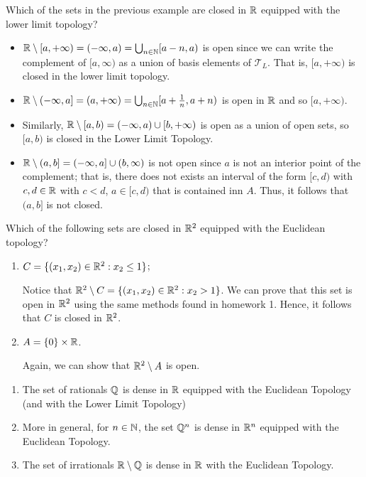 \documentclass[a4paper]{article}
\begin{document}
    \begin{eg}
        Which of the sets in the previous example are closed in \( \mathbb{R}  \) equipped with the lower limit topology?
        \begin{itemize}
            \item \( \mathbb{R} \setminus  [a,+\infty) = (-\infty ,a ) = \bigcup_{ n \in \mathbb{N}  }^{  } [a-n,a)   \) is open since we can write the complement of \( [a,\infty)  \) as a union of basis elements of \( {\mathcal{T}}_{L} \). That is, \( [a,+\infty) \) is closed in the lower limit topology.
            \item \( \mathbb{R} \setminus  (-\infty ,a] = (a,+\infty ) = \bigcup_{ n \in \mathbb{N}  }^{  } [a+ \frac{ 1 }{ n } , a + n) \) is open in \( \mathbb{R}  \) and so \( [a,+\infty) \).
            \item Similarly, \( \mathbb{R} \setminus  [a,b) = (-\infty , a) \cup [b,+\infty) \) is open as a union of open sets, so \( [a,b) \) is closed in the Lower Limit Topology.
            \item \( \mathbb{R} \setminus  (a,b] = (-\infty , a] \cup (b,\infty ) \) is not open since \( a  \) is not an interior point of the complement; that is, there does not exists an interval of the form \( [c,d)  \) with \( c,d \in \mathbb{R}  \) with \( c < d  \), \( a \in [c,d)  \) that is contained inn \( A  \). Thus, it follows that \( (a,b]  \) is not closed.
        \end{itemize}
    \end{eg}

\begin{eg}
    Which of the following sets are closed in \( \mathbb{R}^{2} \) equipped with the Euclidean topology? 
    \begin{enumerate}
        \item[(i)] \( C =  \{ ({x}_{1}, {x}_{2}) \in \mathbb{R}^{2} : {x}_{2} \leq 1  \}  \);

            Notice that \( \mathbb{R}^{2} \setminus  C  = \{ ({x}_{1}, {x}_{2}) \in \mathbb{R}^{2} : {x}_{2} > 1  \}  \). We can prove that this set is open in \( \mathbb{R}^{2} \) using the same methods found in homework 1. Hence, it follows that \( C  \) is closed in \( \mathbb{R}^{2} \).
        \item[(ii)] \( A = \{ 0 \}  \times \mathbb{R}  \).

            Again, we can show that \(  \mathbb{R}^{2} \setminus  A   \) is open.
    \end{enumerate}
\end{eg}

\begin{eg}
   \begin{enumerate}
       \item[(i)] The set of rationals \( \mathbb{Q}  \) is dense in \( \mathbb{R}  \) equipped with the Euclidean Topology (and with the Lower Limit Topology)
        \item[(ii)] More in general, for \( n \in \mathbb{N}  \), the set \( \mathbb{Q}^{n} \) is dense in \( \mathbb{R}^{n} \) equipped with the Euclidean Topology.
        \item[(iii)] The set of irrationals \( \mathbb{R} \setminus  \mathbb{Q}  \) is dense in \( \mathbb{R}  \) with the Euclidean Topology.
   \end{enumerate} 
\end{eg}
\end{document}

